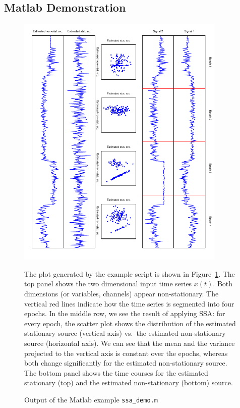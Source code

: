 \documentclass{article}
\newcommand{\1}{\ensuremath{\mathds{1}}}
\newcommand{\0}{\ensuremath{0}}
\begin{document}
\subsection{Matlab Demonstration}
\begin{figure}[h]
\begin{center}
	\includegraphics[angle=90,width=10cm]{ssa_example.pdf}
	\caption{\label{fig:matlab_example}
		Output of the Matlab example \texttt{ssa\_demo.m}} 
\end{center}
The plot generated by the example script is shown in Figure~\ref{fig:matlab_example}. The top panel
shows the two dimensional input time series $x(t)$. Both dimensions (or variables, channels) appear
non-stationary. The vertical red lines indicate how the time series is segmented into four epochs. 
In the middle row, we see the result of applying SSA: for every epoch, the scatter plot shows
the distribution of the estimated stationary source (vertical axis) vs.~the estimated non-stationary 
source (horizontal axis). We can see that the mean and the variance projected to the vertical axis
is constant over the epochs, whereas both change significantly for the estimated non-stationary source. 
The bottom panel shows the time courses for the estimated stationary (top) and the estimated non-stationary 
(bottom) source. 
\end{figure}

\FloatBarrier
\end{document}
